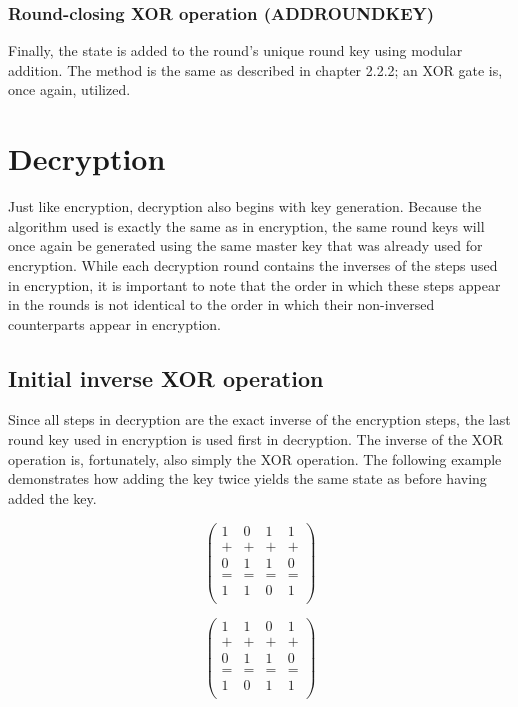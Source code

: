 \documentclass[12pt]{report}
\theoremstyle{definition}
\theoremstyle{remark}
\begin{document}
\subsubsection{Round-closing XOR operation (ADDROUNDKEY)}
Finally, the state is added to the round's unique round key using modular addition. The method is the same as described in chapter 2.2.2; an XOR gate is, once again, utilized.

\section{Decryption}
Just like encryption, decryption also begins with key generation. Because the algorithm used is exactly the same as in encryption, the same round keys will once again be generated using the same master key that was already used for encryption. While each decryption round contains the inverses of the steps used in encryption, it is important to note that the order in which these steps appear in the rounds is not identical to the order in which their non-inversed counterparts appear in encryption.

\subsection{Initial inverse XOR operation}
Since all steps in decryption are the exact inverse of the encryption steps, the last round key used in encryption is used first in decryption\cite{RoundKeyInverse}. The inverse of the XOR operation is, fortunately, also simply the XOR operation. The following example demonstrates how adding the key twice yields the same state as before having added the key.

\[
\left( \begin{array}{cccc}
1 & 0 & 1 & 1 \\
+ & + & + & + \\
0 & 1 & 1 & 0 \\
= & = & = & = \\
1 & 1 & 0 & 1 \\
\end{array} \right)
\]

\[
\left( \begin{array}{cccc}
1 & 1 & 0 & 1 \\
+ & + & + & + \\
0 & 1 & 1 & 0 \\
= & = & = & = \\
1 & 0 & 1 & 1 \\
\end{array} \right)
\]
\end{document}

